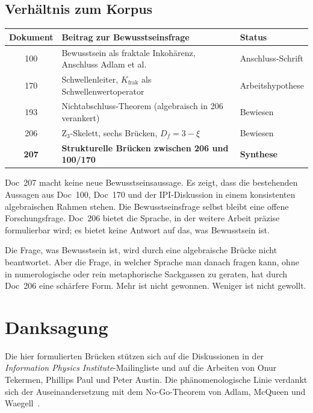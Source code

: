 \subsection{Verhältnis zum Korpus}

\begin{center}
\begin{tabular}{c|p{8cm}|l}
\textbf{Dokument} & \textbf{Beitrag zur Bewusstseinsfrage} & \textbf{Status} \\
\hline
100 & Bewusstsein als fraktale Inkohärenz, Anschluss Adlam et al. & Anschluss-Schrift \\
170 & Schwellenleiter, $K_{\text{frak}}$ als Schwellenwertoperator & Arbeitshypothese \\
193 & Nichtabschluss-Theorem (algebraisch in 206 verankert) & Bewiesen \\
206 & Z$_3$-Skelett, sechs Brücken, $D_f = 3-\xi$ & Bewiesen \\
\textbf{207} & \textbf{Strukturelle Brücken zwischen 206 und 100/170} & \textbf{Synthese} \\
\end{tabular}
\end{center}

Doc~207 macht keine neue Bewusstseinsaussage. Es zeigt, dass die bestehenden Aussagen aus Doc~100, Doc~170 und der IPI-Diskussion in einem konsistenten algebraischen Rahmen stehen. Die Bewusstseinsfrage selbst bleibt eine offene Forschungsfrage. Doc~206 bietet die Sprache, in der weitere Arbeit präzise formulierbar wird; es bietet keine Antwort auf das, was Bewusstsein ist.

\begin{philosophical}[Schluss]
Die Frage, was Bewusstsein ist, wird durch eine algebraische Brücke nicht beantwortet. Aber die Frage, in welcher Sprache man danach fragen kann, ohne in numerologische oder rein metaphorische Sackgassen zu geraten, hat durch Doc~206 eine schärfere Form. Mehr ist nicht gewonnen. Weniger ist nicht gewollt.
\end{philosophical}

\section*{Danksagung}

Die hier formulierten Brücken stützen sich auf die Diskussionen in der \emph{Information Physics Institute}-Mailingliste und auf die Arbeiten von Onur Tekermen, Phillips Paul und Peter Austin. Die phänomenologische Linie verdankt sich der Auseinandersetzung mit dem No-Go-Theorem von Adlam, McQueen und Waegell~\cite{Adlam2025}.

